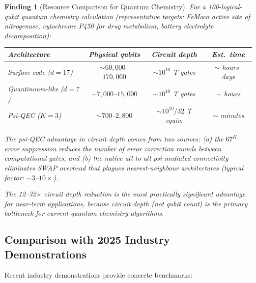 \documentclass[11pt]{article}
\newtheorem{finding}[theorem]{Finding}
\theoremstyle{definition}
\theoremstyle{remark}
\begin{document}
\begin{finding}[Resource Comparison for Quantum Chemistry]
\label{find:resource-chem}
For a 100-logical-qubit quantum chemistry calculation (representative
targets: FeMoco active site of nitrogenase, cytochrome P450 for drug
metabolism, battery electrolyte decomposition):

\begin{center}
\begin{tabular}{@{}lccc@{}}
\toprule
Architecture & Physical qubits & Circuit depth & Est.\ time \\
\midrule
Surface code ($d = 17$) & $\sim 60{,}000$--$170{,}000$ &
  $\sim 10^{10}$ T gates & $\sim$ hours--days \\
Quantinuum-like ($d = 7$) & $\sim 7{,}000$--$15{,}000$ &
  $\sim 10^{10}$ T gates & $\sim$ hours \\
Psi-QEC ($K = 3$) & $\sim 700$--$2{,}800$ &
  $\sim 10^{10}/32$ T equiv. & $\sim$ minutes \\
\bottomrule
\end{tabular}
\end{center}

The psi-QEC advantage in circuit depth comes from two sources:
(a) the $67^K$ error suppression reduces the number of error correction
rounds between computational gates, and (b) the native all-to-all
psi-mediated connectivity eliminates SWAP overhead that plagues
nearest-neighbour architectures (typical factor: $\sim 3$--$10\times$).

The 12--32$\times$ circuit depth reduction is the most practically
significant advantage for near-term applications, because circuit depth
(not qubit count) is the primary bottleneck for current quantum chemistry
algorithms.
\end{finding}

\subsection{Comparison with 2025 Industry Demonstrations}
\label{sec:industry-comparison}

Recent industry demonstrations provide concrete benchmarks:
\end{document}
